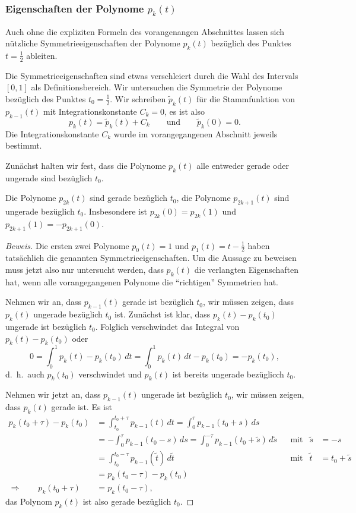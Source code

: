 \subsubsection{Eigenschaften der Polynome $p_k(t)$}
Auch ohne die expliziten Formeln des vorangenangen Abschnittes lassen sich
nützliche Symmetrieeigenschaften der Polynome $p_k(t)$ bezüglich des
Punktes $t=\frac12$ ableiten.

Die Symmetrieeigenschaften sind etwas verschleiert durch die Wahl
des Intervals $[0,1]$ als Definitionsbereich.
Wir untersuchen die Symmetrie der Polynome bezüglich des Punktes
$t_0=\frac12$.
Wir schreiben $\tilde{p}_k(t)$ für die Stammfunktion von $p_{k-1}(t)$ 
mit Integrationskonstante $C_k=0$, es ist also
\[
p_k(t) = \tilde{p}_k(t) + C_k
\qquad\text{und}\qquad
\tilde{p}_k(0)=0.
\]
Die Integrationskonstante $C_k$ wurde im vorangegangenen Abschnitt
jeweils bestimmt.

Zunächst halten wir fest, dass die Polynome $p_k(t)$ alle
entweder gerade oder ungerade sind bezüglich $t_0$.

\begin{lemma}
\label{buch:lemma:pk}
Die Polynome $p_{2k}(t)$ sind gerade bezüglich $t_0$, die Polynome
$p_{2k+1}(t)$ sind ungerade bezüglich $t_0$.
Insbesondere ist $p_{2k}(0)=p_{2k}(1)$ und
$p_{2k+1}(1)=-p_{2k+1}(0)$.
\end{lemma}

\begin{proof}[Beweis]
Die ersten zwei Polynome $p_0(t)=1$ und $p_1(t)=t-\frac12$ haben
tatsächlich die genannten Symmetrieeigenschaften.
Um die Aussage zu beweisen muss jetzt also nur untersucht werden,
dass $p_k(t)$ die verlangten Eigenschaften hat, wenn alle vorangegangenen
Polynome die ``richtigen'' Symmetrien hat.

Nehmen wir an, dass $p_{k-1}(t)$ gerade ist bezüglich $t_0$,
wir müssen zeigen, dass $p_k(t)$ ungerade bezüglich $t_0$ ist.
Zunächst ist klar, dass $p_k(t)-p_k(t_0)$ ungerade ist bezüglich
$t_0$.
Folglich verschwindet das Integral von $p_k(t)-p_k(t_0)$ oder
\[
0
=
\int_0^1p_{k}(t)-p_{k}(t_0)\,dt
=
\int_0^1p_k(t)\,dt - p_k(t_0)
=
-p_k(t_0),
\]
d.~h.~auch $p_k(t_0)$ verschwindet und $p_k(t)$ ist bereits ungerade
bezüglicch $t_0$.

Nehmen wir jetzt an, dass $p_{k-1}(t)$ ungerade ist bezüglich $t_0$,
wir müssen zeigen, dass $p_k(t)$ gerade ist.
Es ist
\begin{align*}
p_k(t_0 +\tau)
-
p_k(t_0)
&=
\int_{t_0}^{t_0+\tau} p_{k-1}(t)\,dt
=
\int_0^\tau p_{k-1}(t_0+s)\,ds
\\
&=
-
\int_0^\tau p_{k-1}(t_0-s)\,ds
=
\int_0^{-\tau} p_{k-1}(t_0+\tilde{s})\,d\tilde{s}
&&\text{mit}
&\tilde{s}&=-s
\\
&=
\int_{t_0}^{t_0-\tau} p_{k-1}(\tilde{t})\,d\tilde{t}
&&\text{mit}
&\tilde{t}&=t_0+\tilde{s}
\\
&=
p_k(t_0-\tau)-p_k(t_0)
\\
\Rightarrow\qquad
p_k(t_0+\tau)
&=
p_k(t_0-\tau),
\end{align*}
das Polynom $p_k(t)$ ist also gerade bezüglich $t_0$.
\end{proof}

